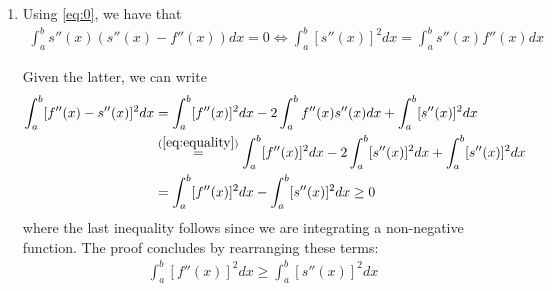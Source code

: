 \documentclass{article}
\begin{document}
\begin{enumerate}[label=(\roman*)]
        \item Using \eqref{eq:0}, we have that
        \begin{align}
            \int_a^b s''(x)(s''(x) - f''(x)) dx = 0 \Longleftrightarrow \int_a^b [s''(x)]^2dx = \int_a^b s''(x) f''(x) dx
            \label{eq:equality}
        \end{align}
        
        Given the latter, we can write
        \begin{align}
           \int_{a}^b [f''(x)-s''(x)]^2 dx &=  \int_{a}^b [f''(x)]^2 dx -  2\int_{a}^b f''(x)s''(x)dx +  \int_{a}^b [s''(x)]^2 dx \\
           &\refEQ{eq:equality} \int_{a}^b [f''(x)]^2 dx -  2\int_{a}^b [s''(x)]^2 dx +  \int_{a}^b [s''(x)]^2 dx \\
           &=\int_{a}^b [f''(x)]^2 dx - \int_{a}^b [s''(x)]^2 dx \geq 0
        \end{align}
        where the last inequality follows since we are integrating a non-negative function. The proof concludes by rearranging these terms:
        \begin{align}
          \int_{a}^b [f''(x)]^2 dx \geq \int_{a}^b [s''(x)]^2 dx
        \end{align}
    \end{enumerate}
\end{document}

